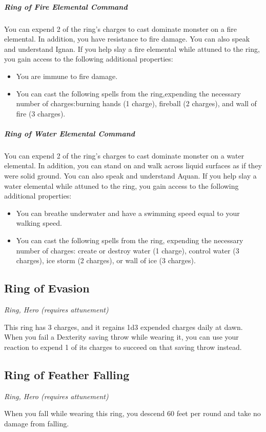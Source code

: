 \subparagraph*{Ring of Fire Elemental Command}
You can expend 2 of the ring's charges to cast dominate monster on a fire elemental. In addition, you have resistance to fire damage. You can also speak and understand Ignan. If you help slay a fire elemental while attuned to the ring, you gain access to the following additional properties:
\begin{itemize}
\item You are immune to fire damage.
\item You can cast the following spells from the ring,expending the necessary number of charges:burning hands (1 charge), fireball (2 charges), and wall of fire (3 charges).
\end{itemize}

\subparagraph*{Ring of Water Elemental Command}
You can expend 2 of the ring's charges to cast dominate monster on a water elemental. In addition, you can stand on and walk across liquid surfaces as if they were solid ground. You can also speak and understand Aquan.  If you help slay a water elemental while attuned to the ring, you gain access to the following additional properties:
\begin{itemize}
\item You can breathe underwater and have a swimming speed equal to your walking speed.
\item You can cast the following spells from the ring, expending the necessary number of charges: create or destroy water (1 charge), control water (3 charges), ice storm (2 charges), or wall of ice (3 charges).
\end{itemize}

\subsection{Ring of Evasion}
\textit{Ring, Hero (requires attunement)} 

This ring has 3 charges, and it regains 1d3 expended charges daily at dawn. When you fail a Dexterity saving throw while wearing it, you can use your reaction to expend 1 of its charges to succeed on that saving throw instead.

\subsection{Ring of Feather Falling}
\textit{Ring, Hero (requires attunement)}

When you fall while wearing this ring, you descend 60 feet per round and take no damage from falling.

